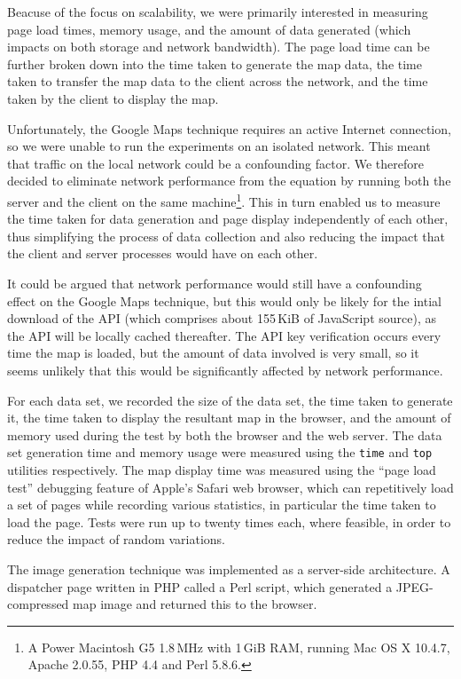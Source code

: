 \documentclass[acmtocl,acmnow]{acmtrans2m}
\begin{document}
Beacuse of the focus on scalability, we were primarily interested in
measuring page load times, memory usage, and the amount of data
generated (which impacts on both storage and network bandwidth). The
page load time can be further broken down into the time taken to
generate the map data, the time taken to transfer the map data to the
client across the network, and the time taken by the client to display
the map.

Unfortunately, the Google Maps technique requires an active Internet
connection, so we were unable to run the experiments on an isolated
network. This meant that traffic on the local network could be a
confounding factor. We therefore decided to eliminate network
performance from the equation by running both the server and the client
on the same machine\footnote{A Power Macintosh G5 1.8\,MHz with 1\,GiB
RAM, running Mac OS X 10.4.7, Apache 2.0.55, PHP 4.4 and Perl 5.8.6.}.
This in turn enabled us to measure the time taken for data generation
and page display independently of each other, thus simplifying the
process of data collection and also reducing the impact that the client
and server processes would have on each other.

It could be argued that network performance would still have a
confounding effect on the Google Maps technique, but this would only be
likely for the intial download of the API (which comprises about
155\,KiB of JavaScript source), as the API will be locally cached
thereafter. The API key verification occurs every time the map is
loaded, but the amount of data involved is very small, so it seems
unlikely that this would be significantly affected by network
performance.

For each data set, we recorded the size of the data set, the time taken
to generate it, the time taken to display the resultant map in the
browser, and the amount of memory used during the test by both the
browser and the web server. The data set generation time and memory
usage were measured using the \texttt{time} and \texttt{top} utilities
respectively. The map display time was measured using the ``page load
test'' debugging feature of Apple's Safari web browser, which can
repetitively load a set of pages while recording various statistics, in
particular the time taken to load the page. Tests were run up to twenty
times each, where feasible, in order to reduce the impact of random
variations.


The image generation technique was implemented as a server-side
architecture. A dispatcher page written in PHP called a Perl script,
which generated a JPEG-compressed map image and returned this to the
browser.
\end{document}
